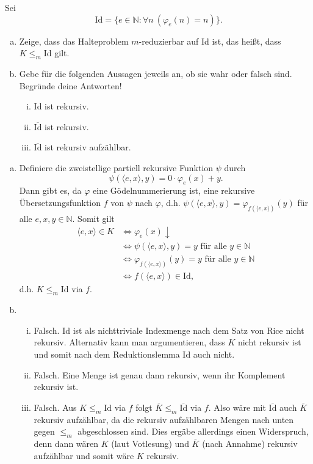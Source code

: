 \documentclass[german,headsepline]{scrartcl}
\theoremstyle{definition}
\begin{document}
	\begin{question}[subtitle={Klausur 2012}]
		Sei
		\[\text{Id}=\{e\in\mathbb{N}\colon\forall n~(\varphi_e(n)=n)\}.\]
		\begin{enumerate}[(a)]
			\item Zeige, dass das Halteproblem $m$-reduzierbar auf Id ist, das heißt, dass $K\leq_m\text{Id}$ gilt.
			\item Gebe für die folgenden Aussagen jeweils an, ob sie wahr oder falsch sind.
				Begründe deine Antworten!
				\begin{enumerate}[(i)]
					\item Id ist rekursiv.
					\item $\overline{\text{Id}}$ ist rekursiv.
					\item $\overline{\text{Id}}$ ist rekursiv aufzählbar.
				\end{enumerate}
		\end{enumerate}
	\end{question}
	\begin{solution}
		\begin{enumerate}[(a)]
			\item Definiere die zweistellige partiell rekursive Funktion $\psi$ durch
				\[\psi(\langle e,x\rangle,y)=0\cdot\varphi_e(x)+y.\]
				Dann gibt es, da $\varphi$ eine Gödelnummerierung ist,
				eine rekursive Übersetzungsfunktion $f$ von $\psi$ nach $\varphi$,
				d.h. $\psi(\langle e,x\rangle,y)=\varphi_{f(\langle e,x\rangle)}(y)$ für alle $e,x,y\in\mathbb{N}$.
				Somit gilt
				\begin{align*}
					\langle e,x\rangle\in K &\Leftrightarrow \varphi_e(x)\downarrow \\
					&\Leftrightarrow \psi(\langle e,x\rangle,y)=y\text{ für alle }y\in\mathbb{N} \\
					&\Leftrightarrow \varphi_{f(\langle e,x\rangle)}(y)=y\text{ für alle }y\in\mathbb{N} \\
					&\Leftrightarrow f(\langle e,x\rangle)\in\text{Id},
				\end{align*}
				d.h. $K\leq_m\text{Id}$ via $f$.
			\item \begin{enumerate}[(i)]
				\item Falsch. Id ist als nichttriviale Indexmenge nach dem Satz von Rice nicht rekursiv.
					Alternativ kann man argumentieren, dass $K$ nicht rekursiv ist und somit nach dem Reduktionslemma Id auch nicht.
				\item Falsch. Eine Menge ist genau dann rekursiv, wenn ihr Komplement rekursiv ist.
				\item Falsch. Aus $K\leq_m\text{Id}$ via $f$ folgt $\overline{K}\leq_m\overline{\text{Id}}$ via $f$.
					Also wäre mit $\overline{\text{Id}}$ auch $\overline{K}$ rekursiv aufzählbar,
					da die rekursiv aufzählbaren Mengen nach unten gegen $\leq_m$ abgeschlossen sind.
					Dies ergäbe allerdings einen Widerspruch,
					denn dann wären $K$ (laut Votlesung) und $\overline{K}$ (nach Annahme) rekursiv aufzählbar und somit wäre $K$ rekursiv.
			\end{enumerate}
		\end{enumerate}
	\end{solution}
	
\end{document}
